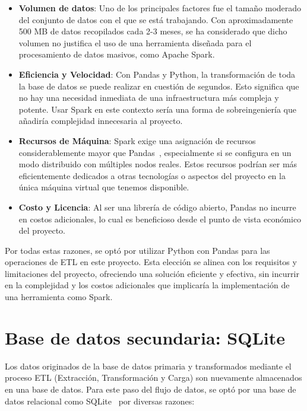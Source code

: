 \begin{itemize}
\item \textbf{Volumen de datos}: Uno de los principales factores fue el tamaño moderado del conjunto de datos con el que se está trabajando. Con aproximadamente 500 MB de datos recopilados cada 2-3 meses, se ha considerado que dicho volumen no justifica el uso de una herramienta diseñada para el procesamiento de datos masivos, como Apache Spark.

\item \textbf{Eficiencia y Velocidad}: Con Pandas y Python, la transformación de toda la base de datos se puede realizar en cuestión de segundos. Esto significa que no hay una necesidad inmediata de una infraestructura más compleja y potente. Usar Spark en este contexto sería una forma de sobreingeniería que añadiría complejidad innecesaria al proyecto.

\item \textbf{Recursos de Máquina}: Spark exige una asignación de recursos considerablemente mayor que Pandas~\cite{spark_resources}, especialmente si se configura en un modo distribuido con múltiples nodos reales. Estos recursos podrían ser más eficientemente dedicados a otras tecnologías o aspectos del proyecto en la única máquina virtual que tenemos disponible.

\item \textbf{Costo y Licencia}: Al ser una librería de código abierto, Pandas no incurre en costos adicionales, lo cual es beneficioso desde el punto de vista económico del proyecto.
\end{itemize}

Por todas estas razones, se optó por utilizar Python con Pandas para las operaciones de ETL en este proyecto. Esta elección se alinea con los requisitos y limitaciones del proyecto, ofreciendo una solución eficiente y efectiva, sin incurrir en la complejidad y los costos adicionales que implicaría la implementación de una herramienta como Spark.

\section{Base de datos secundaria: SQLite}\label{sec:sql_section}

Los datos originados de la base de datos primaria y transformados mediante el proceso ETL (Extracción, Transformación y Carga) son nuevamente almacenados en una base de datos. Para este paso del flujo de datos, se optó por una base de datos relacional como SQLite~\cite{sqlite} por diversas razones:

